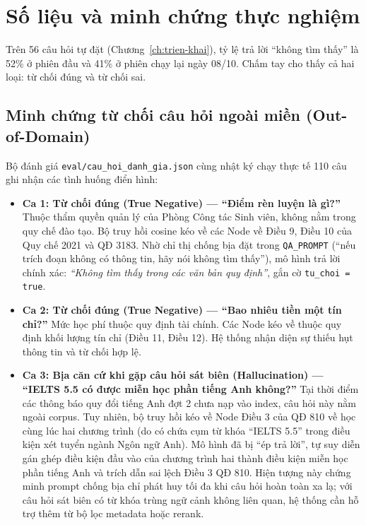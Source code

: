\section{Số liệu và minh chứng thực nghiệm}

Trên 56 câu hỏi tự đặt (Chương~\ref{ch:trien-khai}), tỷ lệ trả lời ``không tìm thấy'' là 52\% ở phiên
đầu và 41\% ở phiên chạy lại ngày 08/10. Chấm tay cho thấy cả hai loại: từ chối đúng và từ chối sai.

\subsection{Minh chứng từ chối câu hỏi ngoài miền (Out-of-Domain)}

Bộ đánh giá \texttt{eval/cau\_hoi\_danh\_gia.json} cùng nhật ký chạy thực tế 110 câu ghi nhận các tình huống điển hình:

\begin{itemize}
  \item \textbf{Ca 1: Từ chối đúng (True Negative) --- ``Điểm rèn luyện là gì?''}
        Thuộc thẩm quyền quản lý của Phòng Công tác Sinh viên, không nằm trong quy chế đào tạo. Bộ truy hồi cosine kéo về các Node về Điều 9, Điều 10 của Quy chế 2021 và QĐ 3183. Nhờ chỉ thị chống bịa đặt trong \texttt{QA\_PROMPT} (``nếu trích đoạn không có thông tin, hãy nói không tìm thấy''), mô hình trả lời chính xác: \textit{``Không tìm thấy trong các văn bản quy định''}, gắn cờ \texttt{tu\_choi = true}.
  \item \textbf{Ca 2: Từ chối đúng (True Negative) --- ``Bao nhiêu tiền một tín chỉ?''}
        Mức học phí thuộc quy định tài chính. Các Node kéo về thuộc quy định khối lượng tín chỉ (Điều 11, Điều 12). Hệ thống nhận diện sự thiếu hụt thông tin và từ chối hợp lệ.
  \item \textbf{Ca 3: Bịa căn cứ khi gặp câu hỏi sát biên (Hallucination) --- ``IELTS 5.5 có được miễn học phần tiếng Anh không?''}
        Tại thời điểm các thông báo quy đổi tiếng Anh đợt 2 chưa nạp vào index, câu hỏi này nằm ngoài corpus. Tuy nhiên, bộ truy hồi kéo về Node Điều 3 của QĐ 810 về học cùng lúc hai chương trình (do có chứa cụm từ khóa ``IELTS 5.5'' trong điều kiện xét tuyển ngành Ngôn ngữ Anh). Mô hình đã bị ``ép trả lời'', tự suy diễn gán ghép điều kiện đầu vào của chương trình hai thành điều kiện miễn học phần tiếng Anh và trích dẫn sai lệch Điều 3 QĐ 810. Hiện tượng này chứng minh prompt chống bịa chỉ phát huy tối đa khi câu hỏi hoàn toàn xa lạ; với câu hỏi sát biên có từ khóa trùng ngữ cảnh không liên quan, hệ thống cần hỗ trợ thêm từ bộ lọc metadata hoặc rerank.
\end{itemize}

